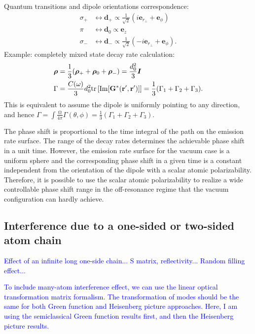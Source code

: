 \documentclass[preprint,aps,pra,onecolumn]{revtex4-1} %
\begin{document}
Quantum transitions and dipole orientations correspondence:
\begin{align}
\sigma_+ &\leftrightarrow \mathbf{d}_+\propto \frac{1}{\sqrt{2}}(i\mathbf{e}_{r\!_\perp}+\mathbf{e}_\phi)\\
\pi &\leftrightarrow \mathbf{d}_0 \propto \mathbf{e}_z\\
\sigma_- &\leftrightarrow \mathbf{d}_-\propto \frac{1}{\sqrt{2}}(-i\mathbf{e}_{r\!_\perp}+\mathbf{e}_\phi).
\end{align}
Example: completely mixed state decay rate calculation:
\begin{align}
\boldsymbol{\rho} &=\frac{1}{3}(\boldsymbol{\rho}_++\boldsymbol{\rho}_0+\boldsymbol{\rho}_-)=\frac{d_0^2}{3}\boldsymbol{I}\\
\Gamma &=\frac{C(\omega)}{3}d_0^2 \mathrm{tr}\left[ \mathrm{Im}[\mathbf{G}^*(\mathbf{r}',\mathbf{r}')] \right]=\frac{1}{3}(\Gamma_1+\Gamma_2+\Gamma_3).
\end{align}
This is equivalent to assume the dipole is uniformly pointing to any direction, and hence
$\Gamma = \int \frac{\mathrm{\Omega}}{4\pi}\Gamma(\theta,\phi)=\frac{1}{3}(\Gamma_1+\Gamma_2+\Gamma_3)$.


The phase shift is proportional to the time integral of the path on the emission rate surface. The range of the decay rates determines the achievable phase shift in a unit time. However, the emission rate surface for the vacuum case is a uniform sphere and the corresponding phase shift in a given time is a constant independent from the orientation of the dipole with a scalar atomic polarizability. Therefore, it is possible to use the scalar atomic polarizability to realize a wide controllable phase shift range in the off-resonance regime that the vacuum configuration can hardly achieve. 


\subsection{Interference due to a one-sided or two-sided atom chain}\label{sec:atomchain}
\textcolor{blue}{Effect of an infinite long one-side chain... S matrix, reflectivity... Random filling effect...}

\textcolor{blue}{To include many-atom interference effect, we can use the linear optical transformation matrix formalism. The transformation of modes should be the same for both Green function and Heisenberg picture approaches. Here, I am using the semiclassical Green function results first, and then the Heisenberg picture results. } 
\end{document}
